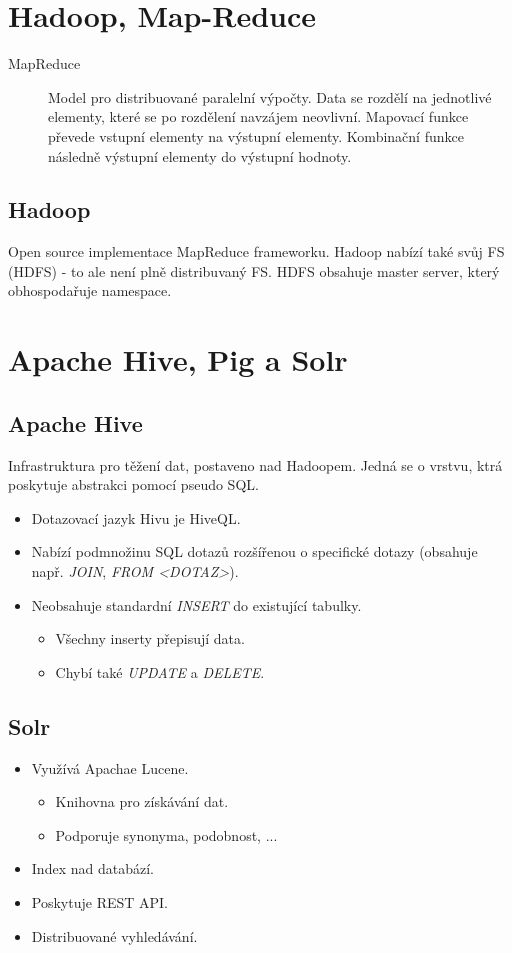 \documentclass{article}
\begin{document}
\section{Hadoop, Map-Reduce}
  \begin{description}
    \item[MapReduce] Model pro distribuované paralelní výpočty. Data se rozdělí na jednotlivé elementy, které se po rozdělení navzájem neovlivní.
    Mapovací funkce převede vstupní elementy na výstupní elementy.
    Kombinační funkce následně výstupní elementy do výstupní hodnoty.
  \end{description}

  \subsection{Hadoop}
    Open source implementace MapReduce frameworku. Hadoop nabízí také svůj FS (HDFS) - to ale není plně distribuvaný FS. HDFS obsahuje master server, který obhospodařuje namespace.

\section{Apache Hive, Pig a Solr}
  \subsection{Apache Hive}
    Infrastruktura pro těžení dat, postaveno nad Hadoopem. Jedná se o vrstvu, ktrá poskytuje abstrakci pomocí pseudo SQL.

    \begin{itemize}
      \item Dotazovací jazyk Hivu je HiveQL.
      \item Nabízí podmnožinu SQL dotazů rozšířenou o specifické dotazy (obsahuje např. \emph{JOIN}, \emph{FROM <DOTAZ>}).
      \item Neobsahuje standardní \emph{INSERT} do existující tabulky.
        \begin{itemize}
          \item Všechny inserty přepisují data.
          \item Chybí také \emph{UPDATE} a \emph{DELETE}.
        \end{itemize}
    \end{itemize}

  \subsection{Solr}
    \begin{itemize}
      \item Využívá Apachae Lucene.
        \begin{itemize}
          \item Knihovna pro získávání dat.
          \item Podporuje synonyma, podobnost, ...
        \end{itemize}
      \item Index nad databází.
      \item Poskytuje REST API.
      \item Distribuované vyhledávání.
    \end{itemize}
\end{document}
